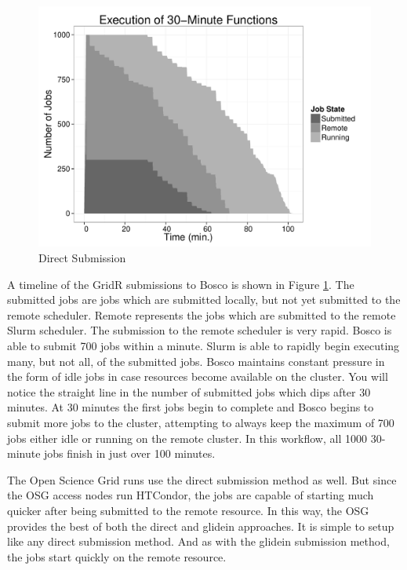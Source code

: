 \begin{figure}[h!t]
\centering
\includegraphics[width=\textwidth]{BoscoRImages/30minplot-color.pdf}

\caption{Direct Submission}
\label{fig:directsubmit}
\end{figure}

A timeline of the GridR submissions to Bosco is shown in Figure \ref{fig:directsubmit}.  The submitted jobs are jobs which are submitted locally, but not yet submitted to the remote scheduler.  Remote represents the jobs which are submitted to the remote Slurm scheduler.  The submission to the remote scheduler is very rapid.  Bosco is able to submit 700 jobs within a minute.  Slurm is able to rapidly begin executing many, but not all, of the submitted jobs.  Bosco maintains constant pressure in the form of idle jobs in case resources become available on the cluster.  You will notice the straight line in the number of submitted jobs which dips after 30 minutes.  At 30 minutes the first jobs begin to complete and Bosco begins to submit more jobs to the cluster, attempting to always keep the maximum of 700 jobs either idle or running on the remote cluster.  In this workflow, all 1000 30-minute jobs finish in just over 100 minutes.

The Open Science Grid runs use the direct submission method as well.  But since the OSG access nodes run HTCondor, the jobs are capable of starting much quicker after being submitted to the remote resource.  In this way, the OSG provides the best of both the direct and glidein approaches.  It is simple to setup like any direct submission method.  And as with the glidein submission method, the jobs start quickly on the remote resource.

